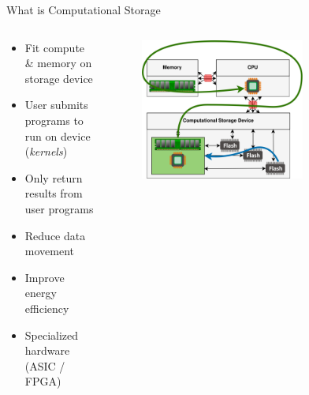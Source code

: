 \documentclass[aspectratio=169]{beamer}
\begin{document}
\begin{frame}{What is Computational Storage}
    \begin{columns}
        \begin{column}{0.35\textwidth}
            \footnotesize
            \begin{itemize}
                \item Fit compute \& memory on storage device
                \item User submits programs to run on device (\textit{kernels})
                \item Only return results from user programs
                \item Reduce data movement
                \item Improve energy efficiency
                \item Specialized hardware \\ (ASIC / FPGA)
            \end{itemize}
        \end{column}
        \begin{column}{0.65\textwidth}
            \begingroup
            \small
            \begin{figure}
                \centering
                \includegraphics[width=0.7\textwidth]{resources/images/csd.png}
            \end{figure}
            \endgroup
        \end{column}
    \end{columns}
\end{frame}
\end{document}
